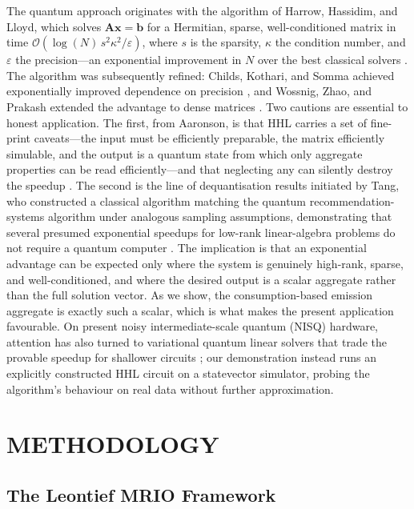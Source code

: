 \documentclass[letterpaper, 10 pt, conference]{ieeeconf}
\newcommand{\bigO}{\mathcal{O}}
\begin{document}
The quantum approach originates with the algorithm of Harrow, Hassidim, and Lloyd, which solves $\mathbf{A}\mathbf{x}=\mathbf{b}$ for a Hermitian, sparse, well-conditioned matrix in time $\bigO(\log(N)\,s^2\kappa^2/\varepsilon)$, where $s$ is the sparsity, $\kappa$ the condition number, and $\varepsilon$ the precision---an exponential improvement in $N$ over the best classical solvers \cite{hhl2009}. The algorithm was subsequently refined: Childs, Kothari, and Somma achieved exponentially improved dependence on precision \cite{childs2017}, and Wossnig, Zhao, and Prakash extended the advantage to dense matrices \cite{wossnig2018}. Two cautions are essential to honest application. The first, from Aaronson, is that HHL carries a set of fine-print caveats---the input must be efficiently preparable, the matrix efficiently simulable, and the output is a quantum state from which only aggregate properties can be read efficiently---and that neglecting any can silently destroy the speedup \cite{aaronson2015}. The second is the line of dequantisation results initiated by Tang, who constructed a classical algorithm matching the quantum recommendation-systems algorithm under analogous sampling assumptions, demonstrating that several presumed exponential speedups for low-rank linear-algebra problems do not require a quantum computer \cite{tang2019}. The implication is that an exponential advantage can be expected only where the system is genuinely high-rank, sparse, and well-conditioned, and where the desired output is a scalar aggregate rather than the full solution vector. As we show, the consumption-based emission aggregate is exactly such a scalar, which is what makes the present application favourable. On present noisy intermediate-scale quantum (NISQ) hardware, attention has also turned to variational quantum linear solvers that trade the provable speedup for shallower circuits \cite{bravoprieto2019}; our demonstration instead runs an explicitly constructed HHL circuit on a statevector simulator, probing the algorithm's behaviour on real data without further approximation.

\section{METHODOLOGY}

\subsection{The Leontief MRIO Framework}
\end{document}
